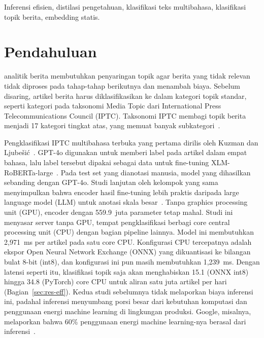 \documentclass[journal]{IEEEtran}
\begin{document}
\begin{IEEEkeywords}
Inferensi efisien, distilasi pengetahuan, klasifikasi teks multibahasa, klasifikasi topik berita, embedding statis.
\end{IEEEkeywords}

\section{Pendahuluan}
\label{sec:introduction}
 analitik berita membutuhkan penyaringan topik agar berita yang tidak relevan tidak diproses pada tahap-tahap berikutnya dan menambah biaya. Sebelum disaring, artikel berita harus diklasifikasikan ke dalam kategori topik standar, seperti kategori pada taksonomi Media Topic dari International Press Telecommunications Council (IPTC). Taksonomi IPTC membagi topik berita menjadi 17 kategori tingkat atas, yang memuat banyak subkategori~\cite{iptc2024mediatopics,kuzman2025llm}.

Pengklasifikasi IPTC multibahasa terbuka yang pertama dirilis oleh Kuzman dan Ljube\v{s}i\'c~\cite{kuzman2025llm}. GPT-4o digunakan untuk memberi label pada artikel dalam empat bahasa, lalu label tersebut dipakai sebagai data untuk fine-tuning XLM-RoBERTa-large~\cite{conneau2020xlmr}. Pada test set yang dianotasi manusia, model yang dihasilkan sebanding dengan GPT-4o. Studi lanjutan oleh kelompok yang sama menyimpulkan bahwa encoder hasil fine-tuning lebih praktis daripada large language model (LLM) untuk anotasi skala besar~\cite{kuzman2025southslavic}. Tanpa graphics processing unit (GPU), encoder dengan 559.9~juta parameter tetap mahal. Studi ini menyasar server tanpa GPU, tempat pengklasifikasi berbagi core central processing unit (CPU) dengan bagian pipeline lainnya. Model ini membutuhkan 2,971~ms per artikel pada satu core CPU. Konfigurasi CPU tercepatnya adalah ekspor Open Neural Network Exchange (ONNX) yang dikuantisasi ke bilangan bulat 8-bit (int8), dan konfigurasi ini pun masih membutuhkan 1,239~ms. Dengan latensi seperti itu, klasifikasi topik saja akan menghabiskan 15.1 (ONNX int8) hingga 34.8 (PyTorch) core CPU untuk aliran satu juta artikel per hari (Bagian~\ref{sec:res-eff}). Kedua studi sebelumnya tidak melaporkan biaya inferensi ini, padahal inferensi menyumbang porsi besar dari kebutuhan komputasi dan penggunaan energi machine learning di lingkungan produksi. Google, misalnya, melaporkan bahwa 60\% penggunaan energi machine learning-nya berasal dari inferensi~\cite{luccioni2024power}.
\end{document}
